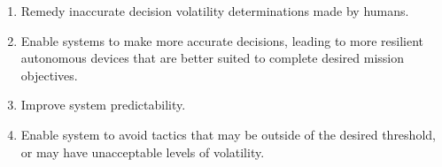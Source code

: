 \documentclass{article}
\begin{document}
\begin{enumerate}[noitemsep]
	\item Remedy inaccurate decision volatility determinations made by humans.
    \item Enable systems to make more accurate decisions, leading to more resilient autonomous devices that are better suited to complete desired mission objectives.
	\item Improve system predictability.
\item Enable system to avoid tactics that may be outside of the desired threshold, or may have unacceptable levels of volatility.


\end{enumerate}
\end{document}
